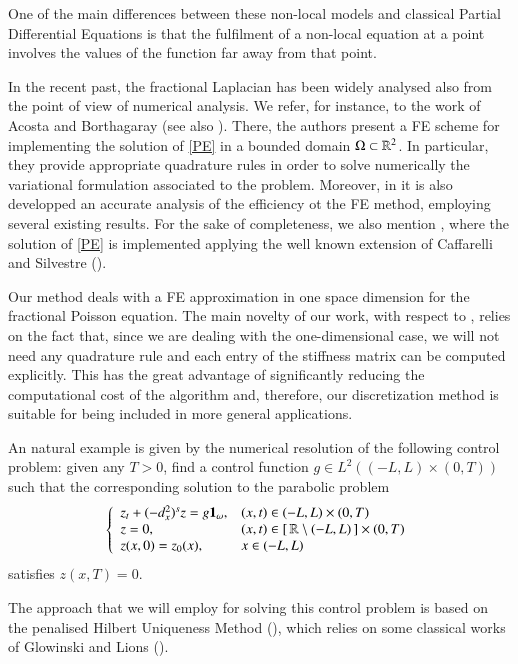 One of the main differences between these non-local models and classical Partial Differential Equations is that the fulfilment of a non-local equation at a point involves the values of the function far away from that point.

In the recent past, the fractional Laplacian has been widely analysed also from the point of view of numerical analysis. We refer, for instance, to the work \cite{acosta2017fractional} of Acosta and Borthagaray (see also \cite{acosta2017short}). There, the authors present a FE scheme for implementing the solution of \eqref{PE} in a bounded domain $\Omega\subset\mathbb{R}^2$. In particular, they provide appropriate quadrature rules in order to solve numerically the variational formulation associated to the problem. Moreover, in \cite{acosta2017fractional} it is also developped an accurate analysis of the efficiency ot the FE method, employing several existing results. For the sake of completeness, we also mention \cite{nochetto2015pde}, where the solution of \eqref{PE} is implemented applying the well known extension of Caffarelli and Silvestre (\cite{caffarelli2007extension}).   

Our method deals with a FE approximation in one space dimension for the fractional Poisson equation. The main novelty of our work, with respect to \cite{acosta2017short,acosta2017fractional}, relies on the fact that, since we are dealing with the one-dimensional case, we will not need any quadrature rule and each entry of the stiffness matrix can be computed explicitly. This has the great advantage of significantly reducing the computational cost of the algorithm and, therefore, our discretization method is suitable for being included in more general applications.  

An natural example is given by the numerical resolution of the following control problem: given any $T>0$, find a control function $g\in L^2((-L,L)\times(0,T))$ such that the corresponding solution to the parabolic problem 
\begin{align}\label{heat_frac}
	\left\{\begin{array}{ll}
	z_t + (-d_x^2)^{s}z = g\mathbf{1}_{\omega}, & (x,t)\in (-L,L)\times(0,T)
	\\
	z=0, & (x,t)\in[\,\mathbb{R}\setminus (-L,L)\,]\times(0,T)
	\\
	z(x,0)=z_0(x), & x\in (-L,L)
	\end{array}\right.
\end{align} 
satisfies $z(x,T)=0$. 

The approach that we will employ for solving this control problem is based on the penalised Hilbert Uniqueness Method (\cite{boyer2013penalised}), which relies on some classical works of Glowinski and Lions (\cite{glowinski1995exact,glowinski2008exact}).   

